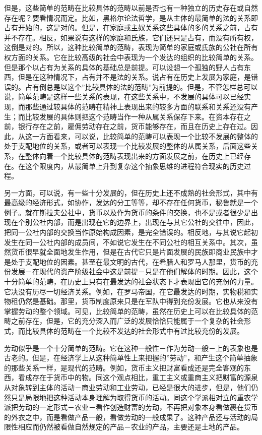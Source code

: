 \documentclass[a4paper,twoside,12pt,AutoFakeBold]{ctexart}
\begin{document}
但是，这些简单的范畴在比较具体的范畴以前是否也有一种独立的历史存在或自然存在呢？要看情况而定。比如，黑格尔论法哲学，是从主体的最简单的法的关系即占有开始的，这是对的。但是，在家庭或主奴关系这些具体的多的关系之前，占有并不存在。相反，如果说有这样的家庭和氏族，它们还只是占有，而没有所有权，这倒是对的。所以，这种比较简单的范畴，表现为简单的家庭或氏族的公社在所有权方面的关系。它在比较高级的社会中表现为一个发达的组织的比较简单的关系。但是那个以占有为关系的具体的基础总是前提。可以设想一个孤独的野人占有东西，但是在这种情况下，占有并不是法的关系。说占有在历史上发展为家庭，是错误的。占有倒总是以这个”比较具体的法的范畴”为前提的。但是，不管怎样总可以说，简单范畴是这样一些关系的表现，在这些关系中，不发展的具体可以已经实现，而那些通过较具体的范畴在精神上表现出来的较多方面的联系和关系还没有产生；而比较发展的具体则把这个范畴当作一种从属关系保存下来。在资本存在之前，银行存在之前，雇佣劳动存在之前，货币能够存在，而且在历史上存在过。因此，从这一方面看来，可以说，比较简单的范畴可以表现一个比较不发展的整体的处于支配地位的关系，或者可以表现一个比较发展的整体的从属关系，后面这些关系，在整体向着一个比较具体的范畴表现出来的方面发展之前，在历史上已经存在。在这个限度内，从最简单上升到复杂这个抽象思维的进程符合现实的历史过程。

另一方面，可以说，有一些十分发展的，但在历史上还不成熟的社会形式，其中有最高级的经济形式，如协作，发达的分工等等，却不存在任何货币，秘鲁就是一个例子。就在斯拉夫公社中，货币以及作为货币的条件的交换，也不是或者很少是出现在个别公社内部，而是出现在它的边界上，出现在与其它公社的交往中，因此，把同一公社内部的交换当作原始构成因素，是完全错误的。相反地，与其说它起初发生在同一公社内部的成员间，不如说它发生在不同公社的相互关系中。其次，虽然货币很早就全面地发生作用，但是在古代它只是片面发展的民族即商业民族中才是处于支配地位的因素。甚至在最文明的古代，在希腊人和罗马人那里，货币的充份发展－在现代的资产阶级社会中这是前提－只是在他们解体的时期。因此，这个十分简单的范畴，在历史上只有在最发达的社会状态下才表现出它的充份的力量。它决没有历尽一切经济关系。例如，在罗马帝国，在它最发达的时期，实物税和实物租仍然是基础。那里，货币制度原来只是在军队中得到充份发展。它也从来没有掌握劳动的整个领域。可见，比较简单的范畴，虽然在历史上可以在比较具体的范畴之前存在，但是，它的充分深入而广泛的发展恰恰只能属于一个复杂的社会形式，而比较具体的范畴在一个比较不发达的社会形式中有过比较充份的发展。

劳动似乎是一个十分简单的范畴。它在这种一般性－作为劳动一般－上的表象也是古老的。但是，在经济学上从这种简单性上来把握的”劳动”，和产生这个简单抽象的那些关系一样，是现代的范畴。例如，货币主义把财富看成还是完全客观的东西，看成存在于货币中的物。同这个观点相比，重工主义或重商主义把财富的源泉从对象转到主体的活动－商业劳动和工业劳动，已经是很大的进步，但是，他们仍然只是局限地把这种活动本身理解为取得货币的活动。同这个学派相对立的重农学派把劳动的一定形式－农业－看作创造财富的劳动，不再把对象本身看做裹在货币的外衣之中，而是看做产品一般，看做劳动的一般成果了。这种产品还与活动的局限性相应而仍然被看做自然规定的产品－农业的产品，主要还是土地的产品。
\end{document}
